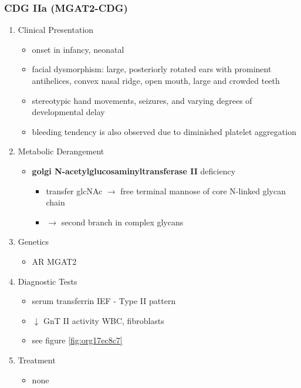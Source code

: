\documentclass[12pt]{scrartcl}
\begin{document}
\subsubsection{CDG IIa (MGAT2-CDG)}
\label{sec:org003994c}
\begin{enumerate}
\item Clinical Presentation
\label{sec:org20c3e87}
\begin{itemize}
\item onset in infancy, neonatal
\item facial dysmorphism: large, posteriorly rotated ears with prominent
antihelices, convex nasal ridge, open mouth, large and crowded
teeth
\item stereotypic hand movements, seizures, and varying degrees of
developmental delay
\item bleeding tendency is also observed due to diminished platelet
aggregation
\end{itemize}

\item Metabolic Derangement
\label{sec:org03c5935}
\begin{itemize}
\item \textbf{golgi N-acetylglucosaminyltransferase II} deficiency
\begin{itemize}
\item transfer glcNAc \(\to\) free terminal mannose of core N-linked glycan chain
\item \(\to\) second branch in complex glycans
\end{itemize}
\end{itemize}
\item Genetics
\label{sec:orgc310ba1}
\begin{itemize}
\item AR MGAT2
\end{itemize}
\item Diagnostic Tests
\label{sec:org156188e}
\begin{itemize}
\item serum transferrin IEF - Type II pattern
\item \(\downarrow\) GnT II activity WBC, fibroblasts
\item see figure \ref{fig:org17ec8c7}
\end{itemize}
\item Treatment
\label{sec:orgcf3547c}
\begin{itemize}
\item none
\end{itemize}
\end{enumerate}
\end{document}
